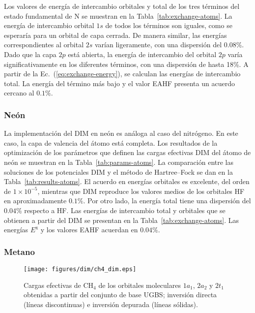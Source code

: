 Los valores de energía de intercambio orbitales y total de los tres 
términos del estado fundamental de N se muestran en la 
Tabla~\ref{tab:exchange-atoms}. La energía de intercambio orbital $1s$ 
de todos los términos son iguales, como se esperaría para un orbital de 
capa cerrada. De manera similar, las energías correspondientes al 
orbital $2s$ varían ligeramente, con una dispersión del $0.08\%$. 
Dado que la capa $2p$ está abierta, la energía de intercambio del 
orbital $2p$ varía significativamente en los diferentes términos, con 
una dispersión de hasta 18\%. 
A partir de la Ec.~(\ref{eq:exchange-energy}), se calculan las energías 
de intercambio total. La energía del término más bajo y el valor EAHF 
presenta un acuerdo cercano al $0.1\%$.

\subsubsection{Neón}

La implementación del DIM en neón es análoga al caso del nitrógeno. En
este caso, la capa de valencia del átomo está completa. Los resultados 
de la optimización de los parámetros que definen las cargas efectivas 
DIM del átomo de neón se muestran en la Tabla~\ref{tab:params-atoms}. La 
comparación entre las soluciones de los potenciales DIM y el método de 
Hartree--Fock se dan en la Tabla~\ref{tab:results-atoms}. El acuerdo en 
energías orbitales es excelente, del orden de $1\times 10^{-5}$, 
mientras que DIM reproduce los valores medios de los orbitales HF en 
aproximadamente $0.1\%$. Por otro lado, la energía total tiene una 
dispersión del $0.04\%$ respecto a HF. Las energías de intercambio total 
y orbitales que se obtienen a partir del DIM se presentan en la 
Tabla~\ref{tab:exchange-atoms}. Las energías $E^{\mathrm{x}}$ y los 
valores EAHF acuerdan en $0.04\%$.

\subsubsection{Metano}

\begin{figure}[t]
\centering
\texttt{[image: figures/dim/ch4\_dim.eps]}
\caption[Cargas invertidas y depuradas de metano.]
{Cargas efectivas de CH$_4$ de los orbitales moleculares $1a_1$, $2a_2$ 
y $2t_1$ obtenidas a partir del conjunto de base UGBS; inversión directa 
(líneas discontinuas) e inversión depurada (líneas sólidas).}
\label{fig:ch4zeff}
\end{figure}

